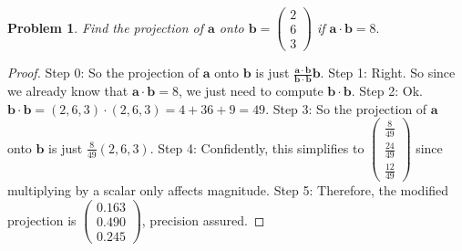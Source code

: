 \documentclass{article}
\newtheorem{theorem}{Problem}
\begin{document}
\begin{theorem}
Find the projection of $\mathbf{a}$ onto $\mathbf{b} = \begin{pmatrix} 2 \\ 6 \\ 3 \end{pmatrix}$ if $\mathbf{a} \cdot \mathbf{b} = 8.$
\end{theorem}

\begin{proof}
Step 0: So the projection of $\mathbf{a}$ onto $\mathbf{b}$ is just $\frac{\mathbf{a} \cdot \mathbf{b}}{\mathbf{b} \cdot \mathbf{b}} \mathbf{b}$.
Step 1: Right. So since we already know that $\mathbf{a} \cdot \mathbf{b} = 8$, we just need to compute $\mathbf{b} \cdot \mathbf{b}$.
Step 2: Ok. $\mathbf{b} \cdot \mathbf{b} = (2,6,3) \cdot (2,6,3) = 4 + 36 + 9 = 49$.
Step 3: So the projection of $\mathbf{a}$ onto $\mathbf{b}$ is just $\frac{8}{49} (2,6,3)$.
Step 4: Confidently, this simplifies to $\begin{pmatrix} \frac{8}{49} \\ \frac{24}{49} \\ \frac{12}{49} \end{pmatrix}$ since multiplying by a scalar only affects magnitude.
Step 5: Therefore, the modified projection is $\begin{pmatrix} 0.163 \\ 0.490 \\ 0.245 \end{pmatrix}$, precision assured.
\end{proof}
\end{document}
